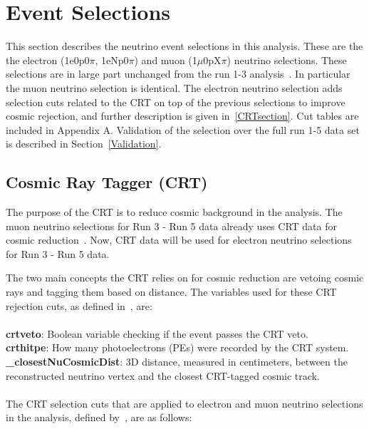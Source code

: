 \section{Event Selections}
\label{sec:EventSelections}



This section describes the neutrino event selections in this analysis. These are the the electron (1e0p0$\pi$, 1eNp0$\pi$) and muon (1$\mu$0pX$\pi$) neutrino selections.  These selections are in large part unchanged from the run 1-3 analysis~\cite{PELEEpaper}.  In particular the muon neutrino selection is identical.  The electron neutrino selection adds selection cuts related to the CRT on top of the previous selections to improve cosmic rejection, and further description is given in~\ref{CRTsection}. Cut tables are included in Appendix A.  Validation of the selection over the full run 1-5 data set is described in Section~\ref{Validation}.  

\subsection{Cosmic Ray Tagger (CRT)}
\label{sec:CRTsection}

The purpose of the CRT is to reduce cosmic background in the analysis. The muon neutrino selections for Run 3 - Run 5 data already uses CRT data for cosmic reduction~\cite{PELEEpaper,PELEEtechnote}. Now, CRT data will be used for electron neutrino selections for Run 3 - Run 5 data. 

The two main concepts the CRT relies on for cosmic reduction are vetoing cosmic rays and tagging them based on distance. The variables used for these CRT rejection cuts, as defined in~\cite{PELEEtechnote}, are:\\
\\
\textbf{crtveto}: Boolean variable checking if the event passes the CRT veto.\\
\textbf{crthitpe}: How many photoelectrons (PEs) were recorded by the CRT system.\\
\textbf{\_closestNuCosmicDist}: 3D distance, measured in centimeters, between the reconstructed neutrino vertex and the closest CRT-tagged cosmic track.\\
\\
The CRT selection cuts that are applied to electron and muon neutrino selections in the analysis, defined by~\cite{PELEEtechnote}, are as follows:

